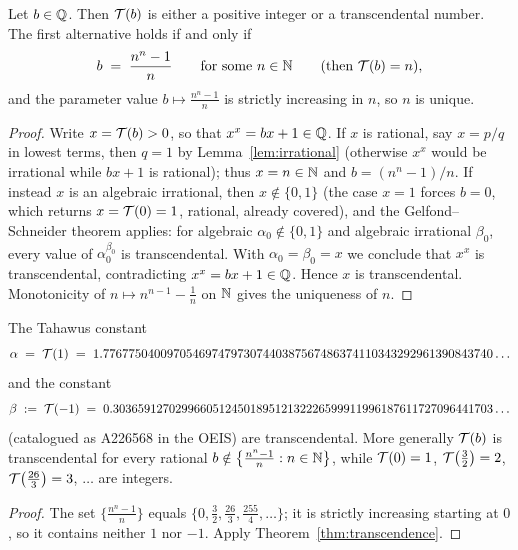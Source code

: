 \begin{theorem}
\label{thm:transcendence}
Let $b \in \mathbb{Q}$. Then $\mathcal{T}(b)$ is either a positive integer or a
transcendental number. The first alternative holds if and only if
\[
    b \;=\; \frac{n^{n} - 1}{n} \qquad\text{for some } n \in \mathbb{N}
    \qquad(\text{then } \mathcal{T}(b) = n),
\]
and the parameter value $b \mapsto \tfrac{n^{n}-1}{n}$ is strictly
increasing in $n$, so $n$ is unique.
\end{theorem}

\begin{proof}
Write $x = \mathcal{T}(b) > 0$, so that $x^{x} = bx + 1 \in \mathbb{Q}$.
If $x$ is rational, say $x = p/q$ in lowest terms, then $q = 1$ by
Lemma~\ref{lem:irrational} (otherwise $x^{x}$ would be irrational while
$bx+1$ is rational); thus $x = n \in \mathbb{N}$ and
$b = (n^{n} - 1)/n$. If instead $x$ is an algebraic irrational, then
$x \notin \{0,1\}$ (the case $x = 1$ forces $b = 0$, which returns
$x = \mathcal{T}(0) = 1$, rational, already covered), and the
Gelfond--Schneider theorem \cite{gelfond} applies: for algebraic
$\alpha_{0} \notin \{0,1\}$ and algebraic irrational $\beta_{0}$,
every value of $\alpha_{0}^{\beta_{0}}$ is transcendental. With
$\alpha_{0} = \beta_{0} = x$ we conclude that $x^{x}$ is transcendental,
contradicting $x^{x} = bx + 1 \in \mathbb{Q}$. Hence $x$ is transcendental.
Monotonicity of $n \mapsto n^{n-1} - \tfrac1n$ on $\mathbb{N}$ gives the
uniqueness of $n$.
\end{proof}

\begin{corollary}\label{cor:stanley}
The Tahawus constant
\[
    \alpha \;=\; \mathcal{T}(1)
    \;=\; 1.7767750400970546974797307440387567486374110343292961390843740\ldots
\]
and the constant
\[
    \beta \;:=\; \mathcal{T}(-1)
    \;=\; 0.3036591270299660512450189512132226599911996187611727096441703\ldots
\]
(catalogued as \textrm{A226568} in the OEIS)
are transcendental. More generally $\mathcal{T}(b)$ is transcendental for every
rational $b \notin \bigl\{\tfrac{n^{n}-1}{n} : n \in \mathbb{N}\bigr\}$, while
$\mathcal{T}(0) = 1$, $\mathcal{T}\bigl(\tfrac32\bigr) = 2$,
$\mathcal{T}\bigl(\tfrac{26}{3}\bigr) = 3$, $\dots$ are integers.
\end{corollary}

\begin{proof}
The set $\bigl\{\tfrac{n^{n}-1}{n}\bigr\}$ equals
$\{0, \tfrac32, \tfrac{26}3, \tfrac{255}4, \ldots\}$; it is strictly
increasing starting at $0$, so it contains neither $1$ nor $-1$.
Apply Theorem~\ref{thm:transcendence}.
\end{proof}


